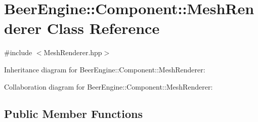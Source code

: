 \hypertarget{class_beer_engine_1_1_component_1_1_mesh_renderer}{}\section{Beer\+Engine\+:\+:Component\+:\+:Mesh\+Renderer Class Reference}
\label{class_beer_engine_1_1_component_1_1_mesh_renderer}


{\ttfamily \#include $<$Mesh\+Renderer.\+hpp$>$}



Inheritance diagram for Beer\+Engine\+:\+:Component\+:\+:Mesh\+Renderer\+:


Collaboration diagram for Beer\+Engine\+:\+:Component\+:\+:Mesh\+Renderer\+:
\subsection*{Public Member Functions}
